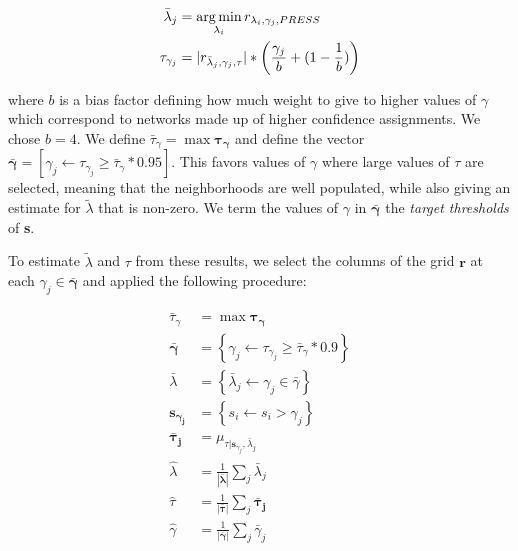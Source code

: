     \begin{align}
        {\bar \lambda_j} &= \operatorname*{arg\,min}_{\lambda_i}{r_{\lambda_i, \gamma_j, PRESS}} \\
        \tau_{\gamma_j} &= |r_{{\bar \lambda_j}, \gamma_j, \tau}| * \left(
            \frac{\gamma_j}{b} + (1 - \frac{1}{b})\right)
    \end{align}

    \noindent where $b$ is a bias factor defining how much
    weight to give to higher values of $\gamma$ which
    correspond to networks made up of higher confidence
    assignments. We chose $b = 4$. We define ${\bar \tau_\gamma} =
    \max{\mathbf{\tau_\gamma}}$ and define the  vector
    $\mathbf{\bar \gamma} = \left[\gamma_j \leftarrow\tau_{\gamma_j}
    \ge {\bar \tau_\gamma} * 0.95\right]$. This favors values of
    $\gamma$ where large values of $\tau$ are selected, meaning that
    the neighborhoods are well populated, while also giving an estimate
    for ${\tilde \lambda}$ that is non-zero. We term the values of
    $\gamma$ in $\mathbf{{\bar \gamma}}$ the {\em target thresholds}
    of \textbf{s}.

        To estimate ${\tilde \lambda}$ and $\tau$ from these results,
    we select the columns of the grid $\mathbf{r}$ at each $\gamma_j
    \in \mathbf{{\bar \gamma}}$ and applied the following procedure:

    \begin{align}
    {\bar \tau_\gamma} &= \max{\mathbf{\tau_\gamma}}\\
    \mathbf{\bar \gamma} &= \left\{\gamma_j \leftarrow\tau_{\gamma_j}
        \ge {\bar \tau_\gamma} * 0.9\right\}\\
    {\bar \lambda} &= \left\{ {\bar \lambda_j} \leftarrow \gamma_j \in {\bar \gamma}\right\}\\
    \mathbf{s_{\gamma_j}} &= \left\{s_i \leftarrow s_i > \gamma_j\right\} \\
    \mathbf{{\bar \tau_j}} &= \mu_{\tau|\mathbf{s}_{\gamma_j}, {\bar \lambda}_j}\\
    {\hat \lambda} &= \frac{1}{|\mathbf{{\bar \lambda}}|}\sum_j {\bar \lambda}_j\\
    {\hat \tau} &= \frac{1}{|\mathbf{{\bar \tau}}|}\sum_j \mathbf{{\bar \tau_j}}\\
    {\hat \gamma} &= \frac{1}{|\mathbf{{\bar \gamma}}|}\sum_j {\bar \gamma}_j
    \end{align}


